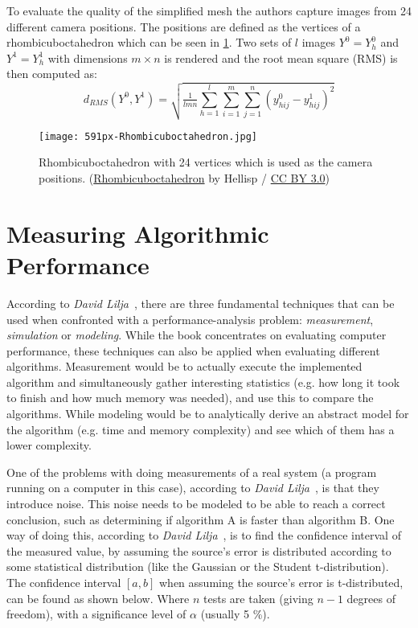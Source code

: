 To evaluate the quality of the simplified mesh the authors capture images from 24 different camera positions. The positions are defined as the vertices of a rhombicuboctahedron which can be seen in \cref{fig:rhombicuboctahedron}. Two sets of $l$ images $Y^0 = {Y^0_h}$ and $Y^1 = {Y^1_h}$ with dimensions $m \times n$ is rendered and the root mean square (RMS) is then computed as:
\begin{equation}  \label{eq:rms_image_sets}
  d_{RMS}(Y^0,Y^1) = \sqrt{\tfrac{1}{lmn}\sum^l_{h=1}\sum^m_{i=1}\sum^n_{j=1}(y^0_{hij} - y^1_{hij})^2}
\end{equation}

\begin{figure}[ht]
    \centering
    \texttt{[image: 591px-Rhombicuboctahedron.jpg]}
    \caption[Rhombicuboctahedron]{Rhombicuboctahedron with 24 vertices which is used as the camera positions. 
      (\href{https://commons.wikimedia.org/wiki/File:Rhombicuboctahedron.jpg}{Rhombicuboctahedron} by Hellisp / \href{https://creativecommons.org/licenses/by/3.0/}{CC BY 3.0})}
    \label{fig:rhombicuboctahedron}
\end{figure}

\section{Measuring Algorithmic Performance} \label{sec:measuring_algorithmic_performance}

According to \emph{David Lilja}~\cite[p.~4]{lilja2005measuring}, there are three fundamental techniques that can be used when confronted with a performance-analysis problem: \emph{measurement}, \emph{simulation} or \emph{modeling}. While the book concentrates on evaluating computer performance, these techniques can also be applied when evaluating different algorithms. Measurement would be to actually execute the implemented algorithm and simultaneously gather interesting statistics (e.g. how long it took to finish and how much memory was needed), and use this to compare the algorithms. While modeling would be to analytically derive an abstract model for the algorithm (e.g. time and memory complexity) and see which of them has a lower complexity.

One of the problems with doing measurements of a real system (a program running on a computer in this case), according to \emph{David Lilja}~\cite[p.~43]{lilja2005measuring}, is that they introduce noise. This noise needs to be modeled to be able to reach a correct conclusion, such as determining if algorithm A is faster than algorithm B. One way of doing this, according to \emph{David Lilja}~\cite[p.~48]{lilja2005measuring}, is to find the confidence interval of the measured value, by assuming the source's error is distributed according to some statistical distribution (like the Gaussian or the Student t-distribution). The confidence interval \([a,b]\) when assuming the source's error is t-distributed, can be found as shown below. Where \(n\) tests are taken (giving \(n-1\) degrees of freedom), with a significance level of \(\alpha\) (usually 5 \%).

